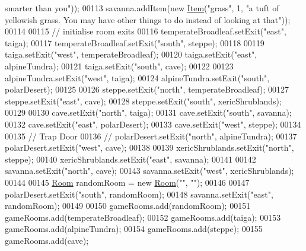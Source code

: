 \begin{DoxyCode}
{       smarter than you"}));
00113         savanna.addItem(\textcolor{keyword}{new} \hyperlink{classItem}{Item}(\textcolor{stringliteral}{"grass"}, 1, \textcolor{stringliteral}{"a tuft of yellowish grass. You may have other things to
       do instead of looking at that"}));
00114 
00115         \textcolor{comment}{// initialise room exits}
00116         temperateBroadleaf.setExit(\textcolor{stringliteral}{"east"}, taiga);
00117         temperateBroadleaf.setExit(\textcolor{stringliteral}{"south"}, steppe);
00118 
00119         taiga.setExit(\textcolor{stringliteral}{"west"}, temperateBroadleaf);
00120         taiga.setExit(\textcolor{stringliteral}{"east"}, alpineTundra);
00121         taiga.setExit(\textcolor{stringliteral}{"south"}, cave);
00122 
00123         alpineTundra.setExit(\textcolor{stringliteral}{"west"}, taiga);
00124         alpineTundra.setExit(\textcolor{stringliteral}{"south"}, polarDesert);
00125 
00126         steppe.setExit(\textcolor{stringliteral}{"north"}, temperateBroadleaf);
00127         steppe.setExit(\textcolor{stringliteral}{"east"}, cave);
00128         steppe.setExit(\textcolor{stringliteral}{"south"}, xericShrublands);
00129 
00130         cave.setExit(\textcolor{stringliteral}{"north"}, taiga);
00131         cave.setExit(\textcolor{stringliteral}{"south"}, savanna);
00132         cave.setExit(\textcolor{stringliteral}{"east"}, polarDesert);
00133         cave.setExit(\textcolor{stringliteral}{"west"}, steppe);
00134 
00135         \textcolor{comment}{// Trap Door}
00136         \textcolor{comment}{// polarDesert.setExit("north", alpineTundra);}
00137         polarDesert.setExit(\textcolor{stringliteral}{"west"}, cave);
00138 
00139         xericShrublands.setExit(\textcolor{stringliteral}{"north"}, steppe);
00140         xericShrublands.setExit(\textcolor{stringliteral}{"east"}, savanna);
00141 
00142         savanna.setExit(\textcolor{stringliteral}{"north"}, cave);
00143         savanna.setExit(\textcolor{stringliteral}{"west"}, xericShrublands);
00144 
00145         \hyperlink{classRoom}{Room} randomRoom = \textcolor{keyword}{new} \hyperlink{classRoom}{Room}(\textcolor{stringliteral}{""}, \textcolor{stringliteral}{""});
00146 
00147         polarDesert.setExit(\textcolor{stringliteral}{"south"}, randomRoom);
00148         savanna.setExit(\textcolor{stringliteral}{"east"}, randomRoom);
00149 
00150         gameRooms.add(randomRoom);
00151         gameRooms.add(temperateBroadleaf);
00152         gameRooms.add(taiga);
00153         gameRooms.add(alpineTundra);
00154         gameRooms.add(steppe);
00155         gameRooms.add(cave);

\end{DoxyCode}
